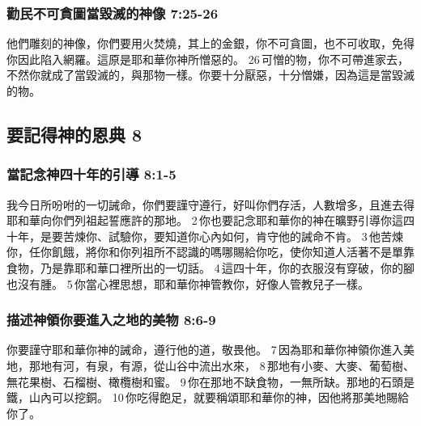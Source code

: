 \subsubsection{勸民不可貪圖當毀滅的神像 7:25-26}
他們雕刻的神像，你們要用火焚燒，其上的金銀，你不可貪圖，也不可收取，免得你因此陷入網羅。這原是耶和華你神所憎惡的。 26 可憎的物，你不可帶進家去，不然你就成了當毀滅的，與那物一樣。你要十分厭惡，十分憎嫌，因為這是當毀滅的物。


\subsection{要記得神的恩典 8}
\subsubsection{當記念神四十年的引導 8:1-5}
我今日所吩咐的一切誡命，你們要謹守遵行，好叫你們存活，人數增多，且進去得耶和華向你們列祖起誓應許的那地。 2 你也要記念耶和華你的神在曠野引導你這四十年，是要苦煉你、試驗你，要知道你心內如何，肯守他的誡命不肯。 3 他苦煉你，任你飢餓，將你和你列祖所不認識的嗎哪賜給你吃，使你知道人活著不是單靠食物，乃是靠耶和華口裡所出的一切話。 4 這四十年，你的衣服沒有穿破，你的腳也沒有腫。 5 你當心裡思想，耶和華你神管教你，好像人管教兒子一樣。

\subsubsection{描述神領你要進入之地的美物 8:6-9}
你要謹守耶和華你神的誡命，遵行他的道，敬畏他。 7 因為耶和華你神領你進入美地，那地有河，有泉，有源，從山谷中流出水來， 8 那地有小麥、大麥、葡萄樹、無花果樹、石榴樹、橄欖樹和蜜。 9 你在那地不缺食物，一無所缺。那地的石頭是鐵，山內可以挖銅。 10 你吃得飽足，就要稱頌耶和華你的神，因他將那美地賜給你了。

